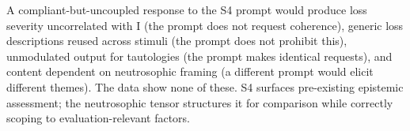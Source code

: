 A compliant-but-uncoupled response to the S4 prompt would produce loss
severity uncorrelated with I (the prompt does not request coherence),
generic loss descriptions reused across stimuli (the prompt does not
prohibit this), unmodulated output for tautologies (the prompt makes
identical requests), and content dependent on neutrosophic framing (a
different prompt would elicit different themes).  The data show none of
these.  S4 surfaces pre-existing epistemic assessment; the neutrosophic
tensor structures it for comparison while correctly scoping to
evaluation-relevant factors.
